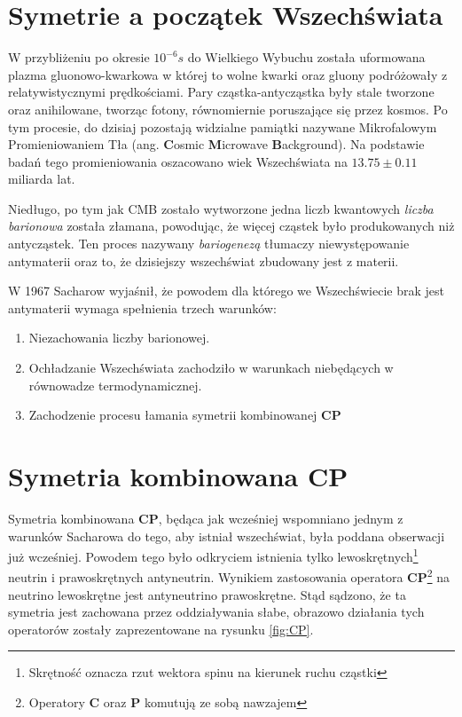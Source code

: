 \section{Symetrie a początek Wszechświata}
W przybliżeniu po okresie $10^{-6}s$ do Wielkiego Wybuchu została uformowana plazma gluonowo-kwarkowa w której to wolne kwarki oraz gluony podróżowały z relatywistycznymi prędkościami. Pary cząstka-antycząstka były stale tworzone oraz anihilowane, tworząc fotony, równomiernie poruszające się przez kosmos. Po tym procesie, do dzisiaj pozostają widzialne pamiątki nazywane Mikrofalowym Promieniowaniem Tła (ang. \textbf{C}osmic \textbf{M}icrowave \textbf{B}ackground). Na podstawie badań tego promieniowania oszacowano wiek Wszechświata na $13.75 \pm 0.11$ miliarda lat.

Niedługo, po tym jak CMB zostało wytworzone jedna liczb kwantowych \textit{liczba barionowa} została złamana, powodując, że więcej cząstek było produkowanych niż antycząstek. Ten proces nazywany \textit{bariogenezą} tłumaczy niewystępowanie antymaterii oraz to, że dzisiejszy wszechświat zbudowany jest z materii.

W 1967 Sacharow  wyjaśnił, że powodem dla którego we Wszechświecie brak jest antymaterii wymaga spełnienia trzech warunków:
\begin{enumerate}
\item Niezachowania liczby barionowej. 
\item Ochładzanie Wszechświata zachodziło w warunkach niebędących w równowadze termodynamicznej. 
\item Zachodzenie procesu łamania symetrii kombinowanej \textbf{CP} 
\end{enumerate}

\section{Symetria kombinowana \textbf{CP}}
Symetria kombinowana \textbf{CP}, będąca jak wcześniej wspomniano jednym z warunków Sacharowa do tego, aby istniał wszechświat, była poddana obserwacji już wcześniej. Powodem tego było odkryciem istnienia tylko lewoskrętnych\footnote{Skrętność oznacza rzut wektora spinu na kierunek ruchu cząstki} neutrin i prawoskrętnych antyneutrin. Wynikiem zastosowania operatora \textbf{CP}\footnote{Operatory \textbf{C} oraz \textbf{P} komutują ze sobą nawzajem} na neutrino lewoskrętne jest antyneutrino prawoskrętne. Stąd sądzono, że ta symetria jest zachowana przez oddziaływania słabe, obrazowo działania tych operatorów zostały zaprezentowane na rysunku \ref{fig:CP}.


